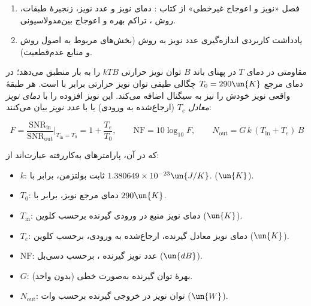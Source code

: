 \documentclass[a4paper,11pt]{article}
\begin{document}
\begin{enumerate}
\item فصل «نویز و اعوجاج غیرخطی» از کتاب
\lr{[1]}:
دمای نویز و عدد نویز، زنجیرهٔ طبقات، روش
،
تراکم بهره و اعوجاج بین‌مدولاسیونی.
\item یادداشت کاربردی اندازه‌گیری عدد نویز به روش
\lr{[2]}
(بخش‌های مربوط به اصول روش و منابع عدم‌قطعیت).
\end{enumerate}




مقاومتی در دمای
$T$
در پهنای باند
$B$
توان نویز حرارتی
$kTB$
را به بار منطبق می‌دهد؛ در دمای مرجع
$T_0 = 290\un{K}$
چگالی طیفی توان نویز حرارتی برابر با
است. هر طبقهٔ واقعی نویز خودش را نیز به سیگنال اضافه می‌کند. این نویز افزوده را با \emph{دمای نویز معادل}
$T_e$
(ارجاع‌شده به ورودی) یا با \emph{عدد نویز} بیان می‌کنند:

\begin{equation}
    F =
    \frac{\mathrm{SNR}_{\mathrm{in}}}
    {\mathrm{SNR}_{\mathrm{out}}}
    \bigg|_{T_{\mathrm{in}} = T_0}
    = 1 + \frac{T_e}{T_0},
    \qquad
    \mathrm{NF} = 10\log_{10} F,
    \qquad
    N_{\mathrm{out}} = G\,k\,(T_{\mathrm{in}} + T_e)\,B
    \label{eq:nf}
\end{equation}

که در آن، پارامترهای به‌کاررفته عبارت‌اند از:

\begin{itemize}
    \item $k$: ثابت بولتزمن، برابر با
    $1.380649\times10^{-23}\un{J/K}$.
    ($\un{K}$).

    \item $T_0$: دمای مرجع نویز، برابر با
    $290\un{K}$.

    \item $T_{\mathrm{in}}$: دمای نویز منبع در ورودی گیرنده برحسب کلوین
    ($\un{K}$).

    \item $T_e$: دمای نویز معادل گیرنده، ارجاع‌شده به ورودی، برحسب کلوین
    ($\un{K}$).

    \item $\mathrm{NF}$: عدد نویز گیرنده ، برحسب دسی‌بل
    ($\un{dB}$).

    \item $G$: بهرهٔ توان گیرنده به‌صورت خطی (بدون واحد).

    \item $N_{\mathrm{out}}$: توان نویز در خروجی گیرنده برحسب وات
    ($\un{W}$).
\end{itemize}
\end{document}
